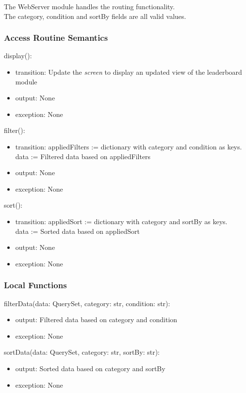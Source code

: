 \documentclass[12pt, titlepage]{article}
\begin{document}
The WebServer module handles the routing functionality. \\
The category, condition and sortBy fields are all valid values.

\subsubsection{Access Routine Semantics}

\noindent display():
\begin{itemize}
\item transition: Update the \textit{screen} to display an updated view of the leaderboard module
\item output: None
\item exception: None
\end{itemize}

\noindent filter():
\begin{itemize}
\item transition: appliedFilters := dictionary with category and condition as keys. \\
data := Filtered data based on appliedFilters
\item output: None
\item exception: None
\end{itemize}

\noindent sort():
\begin{itemize}
\item transition: appliedSort := dictionary with category and sortBy as keys. \\
data := Sorted data based on appliedSort
\item output: None
\item exception: None
\end{itemize}

\subsubsection{Local Functions}

\noindent filterData(data: QuerySet, category: str, condition: str):
\begin{itemize}
\item output: Filtered data based on category and condition
\item exception: None
\end{itemize}

\noindent sortData(data: QuerySet, category: str, sortBy: str):
\begin{itemize}
\item output: Sorted data based on category and sortBy
\item exception: None
\end{itemize}
\end{document}
